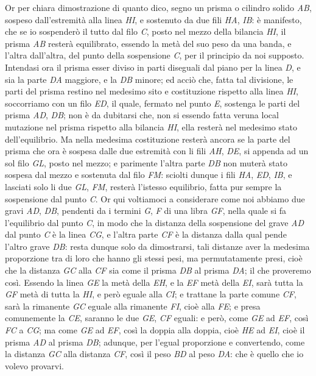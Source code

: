 \documentclass[11pt,twoside,openany]{book}
\begin{document}
Or per chiara dimostrazione di quanto dico, segno un prisma o cilindro solido \emph{AB}, sospeso dall'estremità alla linea \emph{HI}, e sostenuto da due fili \emph{HA}, \emph{IB}: è manifesto, che se io sospenderò il tutto dal filo \emph{C}, posto nel mezzo della bilancia \emph{HI}, il prisma \emph{AB} resterà equilibrato, essendo la metà del suo peso da una banda, e l'altra dall'altra, del punto della sospensione \emph{C}, per il principio da noi supposto. Intendasi ora il prisma esser diviso in parti diseguali dal piano per la linea \emph{D}, e sia la parte \emph{DA} maggiore, e la \emph{DB} minore; ed acciò che, fatta tal divisione, le parti del prisma restino nel medesimo sito e costituzione rispetto alla linea \emph{HI}, soccorriamo con un filo \emph{ED}, il quale, fermato nel punto \emph{E}, sostenga le parti del prisma \emph{AD}, \emph{DB}; non è da dubitarsi che, non si essendo fatta veruna local mutazione nel prisma rispetto alla bilancia \emph{HI}, ella resterà nel medesimo stato dell'equilibrio. Ma nella medesima costituzione resterà ancora se la parte del prisma che ora è sospesa dalle due estremità con li fili \emph{AH}, \emph{DE}, si appenda ad un sol filo \emph{GL}, posto nel mezzo; e parimente l'altra parte \emph{DB} non muterà stato sospesa dal mezzo e sostenuta dal filo \emph{FM}: sciolti dunque i fili \emph{HA}, \emph{ED}, \emph{IB}, e lasciati solo li due \emph{GL}, \emph{FM}, resterà l'istesso equilibrio, fatta pur sempre la sospensione dal punto \emph{C}. Or qui voltiamoci a considerare come noi abbiamo due gravi \emph{AD}, \emph{DB}, pendenti da i termini \emph{G}, \emph{F} di una libra \emph{GF}, nella quale si fa l'equilibrio dal punto \emph{C}, in modo che la distanza della sospensione del grave \emph{AD} dal punto \emph{C} è la linea \emph{CG}, e l'altra parte \emph{CF} è la distanza dalla qual pende l'altro grave \emph{DB}: resta dunque solo da dimostrarsi, tali distanze aver la medesima proporzione tra di loro che hanno gli stessi pesi, ma permutatamente presi, cioè che la distanza \emph{GC} alla \emph{CF} sia come il prisma \emph{DB} al prisma \emph{DA}; il che proveremo così. Essendo la linea \emph{GE} la metà della \emph{EH}, e la \emph{EF} metà della \emph{EI}, sarà tutta la \emph{GF} metà di tutta la \emph{HI}, e però eguale alla \emph{CI}; e trattane la parte comune \emph{CF}, sarà la rimanente \emph{GC} eguale alla rimanente \emph{FI}, cioè alla \emph{FE}; e presa comunemente la \emph{CE}, saranno le due \emph{GE}, \emph{CF} eguali: e però, come \emph{GE} ad \emph{EF}, così \emph{FC} a \emph{CG}; ma come \emph{GE} ad \emph{EF}, così la doppia alla doppia, cioè \emph{HE} ad \emph{EI}, cioè il prisma \emph{AD} al prisma \emph{DB}; adunque, per l'egual proporzione e convertendo, come la distanza \emph{GC} alla distanza \emph{CF}, così il peso \emph{BD} al peso \emph{DA}: che è quello che io volevo provarvi.
\end{document}
